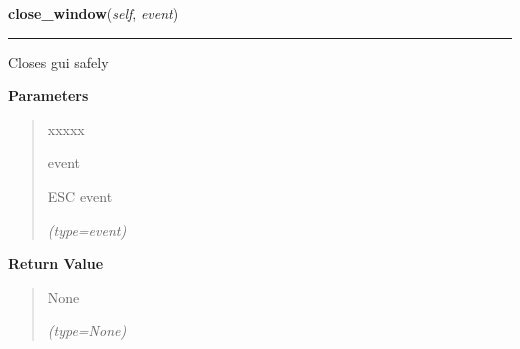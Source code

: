 \hspace{.8\funcindent}\begin{boxedminipage}{\funcwidth}

    \raggedright \textbf{close\_window}(\textit{self}, \textit{event})

    \vspace{-1.5ex}

    \rule{\textwidth}{0.5\fboxrule}
\setlength{\parskip}{2ex}
    Closes gui safely

\setlength{\parskip}{1ex}
      \textbf{Parameters}
      \vspace{-1ex}

      \begin{quote}
        \begin{Ventry}{xxxxx}

          \item[event]

          ESC event

            {\it (type=event)}

        \end{Ventry}

      \end{quote}

      \textbf{Return Value}
    \vspace{-1ex}

      \begin{quote}
      None

      {\it (type=None)}

      \end{quote}

    \end{boxedminipage}

    \label{client_gui:GuiClass:resizeEventTab0}

    \vspace{0.5ex}

